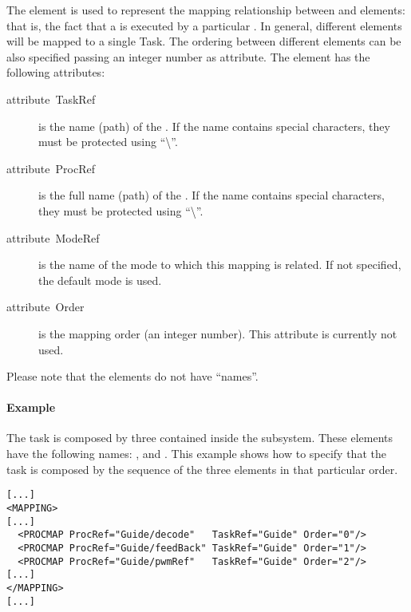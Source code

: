 The  element is used to represent the mapping
relationship between  and  elements: that is,
the fact that a  is executed by a particular
. In general, different  elements will be
mapped to a single Task. The ordering between different 
elements can be also specified passing an integer number as
attribute. The  element has the following attributes:

\begin{description}
\item [{attribute~TaskRef}] is the name (path) of the . If
  the  name contains special characters, they must be
  protected using {}``\textbackslash{}''.
\item [{attribute~ProcRef}] is the full name (path) of the
  .  If the  name contains special characters,
  they must be protected using {}``\textbackslash{}''.
\item [{attribute~ModeRef}] is the name of the mode to which this
  mapping is related. If not specified, the default mode is used.
\item [{attribute~Order}] is the mapping order (an integer
  number). This attribute is currently not used.
\end{description}

Please note that the  elements do not have {}``names''.


\paragraph{Example}

The  task is composed by three  contained
inside the  subsystem. These  elements have
the following names: ,  and
.  This example shows how to specify that the
 task is composed by the sequence of the three
 elements in that particular order.

\begin{lstlisting}
[...]
<MAPPING>
[...]
  <PROCMAP ProcRef="Guide/decode"   TaskRef="Guide" Order="0"/>
  <PROCMAP ProcRef="Guide/feedBack" TaskRef="Guide" Order="1"/>
  <PROCMAP ProcRef="Guide/pwmRef"   TaskRef="Guide" Order="2"/>
[...]
</MAPPING>
[...]
\end{lstlisting}


\subsection{}

